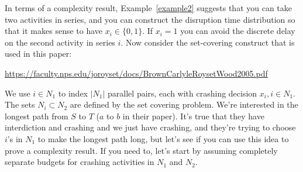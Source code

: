 \documentclass[11pt]{article}
\begin{document}
In terms of a complexity result, Example~\ref{example2} suggests that you can take two activities in series, and you can construct the disruption time distribution so that it makes sense to have $x_i \in \{0,1\}$. If $x_i=1$ you can avoid the discrete delay on the second activity in series $i$. Now consider the set-covering construct that is used in this paper:

\textcolor{blue}{\url{https://faculty.nps.edu/joroyset/docs/BrownCarlyleRoysetWood2005.pdf}}

We use $i \in N_1$ to index $|N_1|$ parallel pairs, each with crashing decision $x_i, i \in N_1$. The sets $N_i \subset N_2$ are defined by the set covering problem. We're interested in the longest path from $S$ to $T$ ($a$ to $b$ in their paper). It's true that they have interdiction and crashing and we just have crashing, and they're trying to choose $i$'s in $N_1$ to make the longest path long, but let's see if you can use this idea to prove a complexity result. If you need to, let's start by assuming completely separate budgets for crashing activities in $N_1$ and $N_2$. 
\end{document}
